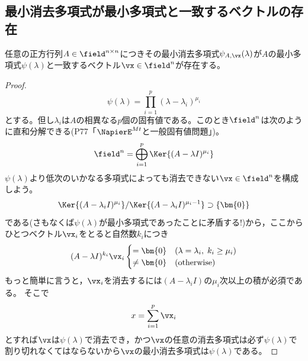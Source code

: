         \subsection{最小消去多項式が最小多項式と一致するベクトルの存在}
            \begin{shadebox}
                任意の正方行列$A\in\field^{n\times n}$につきその最小消去多項式$\psi_{A,\vx}(\lambda)$が$A$の最小多項式$\psi(\lambda)$と一致するベクトル$\vx\in\field^n$が存在する。
            \end{shadebox}
            \begin{proof}
                \quad\par
                \[\psi(\lambda) = \prod_{i=1}^{p}{(\lambda-\lambda_i)^{\mu_i}}\]
                とする。但し$\lambda_i$は$A$の相異なる$p$個の固有値である。このとき$\field^n$は次のように直和分解できる(\cite{新微分方程式対話}\;P77\;「$\NapierE^{Mt}$と一般固有値問題」)。
                \[\field^n = \bigoplus_{i=1}^p{\Ker{(A-\lambda I)^{\mu_i}}}\]
                $\psi(\lambda)$より低次のいかなる多項式によっても消去できない$\vx\in\field^n$を構成しよう。
                \[\Ker{(A-\lambda_i I)^{\mu_i}}/\Ker{(A-\lambda_i I)^{\mu_i-1}}\supset\{\bm{0}\}\]
                である(さもなくば$\psi(\lambda)$が最小多項式であったことに矛盾する!)から，ここからひとつベクトル$\vx_i$をとると自然数$k_i$につき
                \[
                    (A-\lambda I)^{k_i}\vx_i
                    \begin{cases}
                        =\bm{0} & (\lambda=\lambda_i,\;k_i\geq\mu_i)\\
                        \neq\bm{0} & (\mathrm{otherwise})
                    \end{cases}
                \]
                もっと簡単に言うと，$\vx_i$を消去するには$(A-\lambda_i I)$の$\mu_i$次以上の積が必須である。
                そこで
                \[x = \sum_{i=1}^{p}{\vx_i}\]
                とすれば$\vx$は$\psi(\lambda)$で消去でき，かつ$\vx$の任意の消去多項式は必ず$\psi(\lambda)$で割り切れなくてはならないから$\vx$の最小消去多項式は$\psi(\lambda)$である。
            \end{proof}
